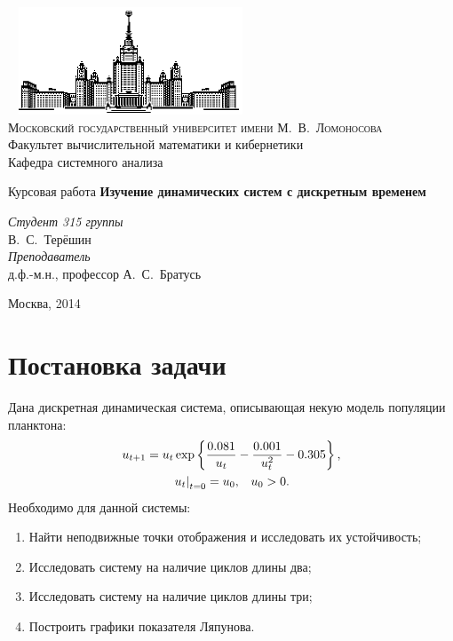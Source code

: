 \documentclass[11pt]{article}
\begin{document}
\thispagestyle{empty}

\begin{center}
\ \vspace{-3cm} \newline
\includegraphics[width=0.5\textwidth]{msu.eps}\\
{\scshape Московский государственный университет имени М.~В.~Ломоносова}\\
Факультет вычислительной математики и кибернетики\\
Кафедра системного анализа

\vfill

{\LARGE Курсовая работа} \newline
{\Huge\bfseries Изучение динамических систем с дискретным временем}
\end{center}

\vspace{1cm}
\begin{flushright}
\large
\textit{Студент 315 группы}\\
В.~С.~Терёшин\\
\vspace{5mm}
\textit{Преподаватель}\\
д.ф.-м.н., профессор А.~С.~Братусь
\end{flushright}

\vfill
\begin{center}
Москва, 2014
\end{center}
\pagebreak
\tableofcontents
\pagebreak
\section{Постановка задачи}
Дана дискретная динамическая система, описывающая некую модель популяции планктона:
\begin{gather}
u_{t+1} = u_t \exp\left\{\frac{0.081}{u_t} - \frac{0.001}{u_t^2} - 0.305\right\}, \notag \\
\left. u_t \right|_{t = 0} = u_0, \; \; \; u_0 > 0. \notag
\end{gather}
Необходимо для данной системы:
\begin{enumerate}
\item
Найти неподвижные точки отображения и исследовать их устойчивость;
\item
Исследовать систему на наличие циклов длины два;
\item
Исследовать систему на наличие циклов длины три;
\item
Построить графики показателя Ляпунова.
\end{enumerate}
\end{document}
